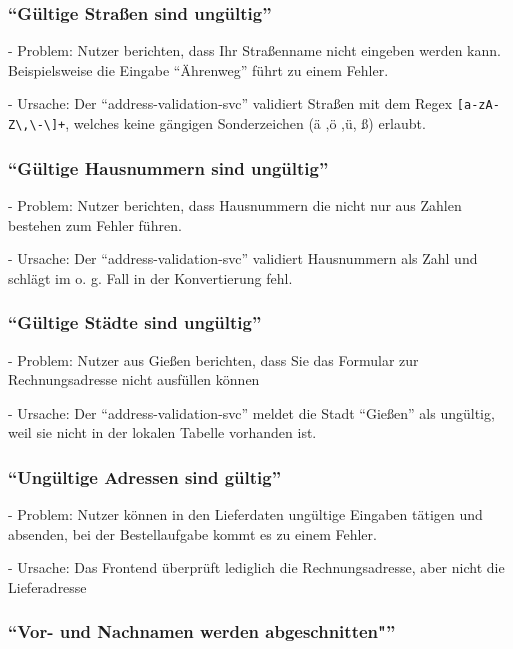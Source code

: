 \subsubsection{\enquote{Gültige Straßen sind ungültig}}

- Problem: Nutzer berichten, dass Ihr Straßenname nicht eingeben werden kann. Beispielsweise die Eingabe \enquote{Ährenweg} führt zu einem Fehler.

- Ursache: Der \enquote{address-validation-svc} validiert Straßen mit dem Regex \texttt{[a-zA-Z\textbackslash,\textbackslash-\textbackslash ]+}, welches keine gängigen Sonderzeichen (ä ,ö ,ü, ß) erlaubt.

\subsubsection{\enquote{Gültige Hausnummern sind ungültig}}

- Problem: Nutzer berichten, dass Hausnummern die nicht nur aus Zahlen bestehen zum Fehler führen.

- Ursache: Der \enquote{address-validation-svc} validiert Hausnummern als Zahl und schlägt im o. g. Fall in der Konvertierung fehl.

\subsubsection{\enquote{Gültige Städte sind ungültig}}

- Problem: Nutzer aus Gießen berichten, dass Sie das Formular zur Rechnungsadresse nicht ausfüllen können

- Ursache: Der \enquote{address-validation-svc} meldet die Stadt \enquote{Gießen} als ungültig, weil sie nicht in der lokalen Tabelle vorhanden ist.

\subsubsection{\enquote{Ungültige Adressen sind gültig}}

- Problem: Nutzer können in den Lieferdaten ungültige Eingaben tätigen und absenden, bei der Bestellaufgabe kommt es zu einem Fehler.

- Ursache: Das Frontend überprüft lediglich die Rechnungsadresse, aber nicht die Lieferadresse

\subsubsection{\enquote{Vor- und Nachnamen werden abgeschnitten"}}

